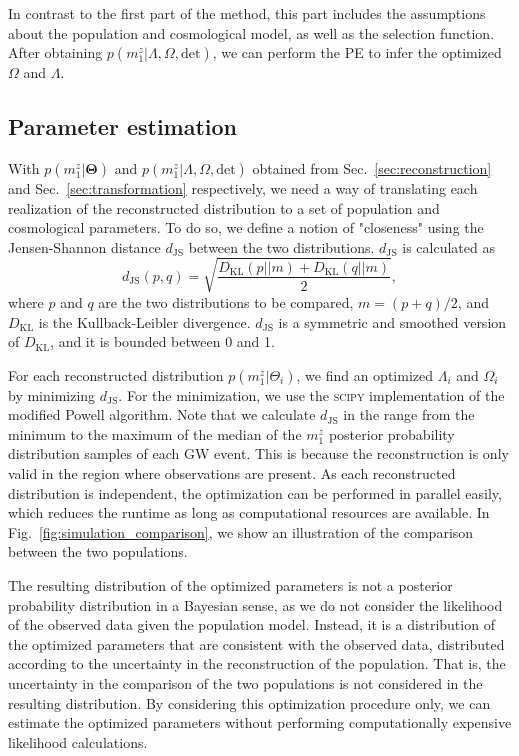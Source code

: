 \documentclass[sn-aps, pdflatex]{sn-jnl}
\begin{document}
In contrast to the first part of the method, this part includes the assumptions about the population and cosmological model, as well as the selection function.
After obtaining $p(m^z_1|\Lambda, \Omega, \mathrm{det})$, we can perform the \ac{PE} to infer the optimized $\Omega$ and $\Lambda$.

\subsection{Parameter estimation}
\label{sec:pe}

With $p(m^z_1|\mathbf{\Theta})$ and $p(m^z_1|\Lambda, \Omega, \mathrm{det})$ obtained from Sec.~\ref{sec:reconstruction} and Sec.~\ref{sec:transformation} respectively, we need a way of translating each realization of the reconstructed distribution to a set of population and cosmological parameters.
To do so, we define a notion of "closeness" using the Jensen-Shannon distance $d_\mathrm{JS}$ between the two distributions.
$d_\mathrm{JS}$ is calculated as
\begin{equation}
    d_\mathrm{JS}(p, q) = \sqrt{\frac{D_\mathrm{KL}(p||m) + D_\mathrm{KL}(q||m)}{2}},
\end{equation}
where $p$ and $q$ are the two distributions to be compared, $m = (p + q) / 2$, and $D_\mathrm{KL}$ is the Kullback-Leibler divergence.
$d_\mathrm{JS}$ is a symmetric and smoothed version of $D_\mathrm{KL}$, and it is bounded between 0 and 1.

For each reconstructed distribution $p(m^z_1|\Theta_i)$, we find an optimized $\Lambda_i$ and $\Omega_i$ by minimizing $d_\mathrm{JS}$.
For the minimization, we use the \textsc{scipy} \citep{2020SciPy-NMeth} implementation of the modified Powell algorithm.
Note that we calculate $d_\mathrm{JS}$ in the range from the minimum to the maximum of the median of the $m^z_1$ posterior probability distribution samples of each \ac{GW} event.
This is because the reconstruction is only valid in the region where observations are present.
As each reconstructed distribution is independent, the optimization can be performed in parallel easily, which reduces the runtime as long as computational resources are available.
In Fig.~\ref{fig:simulation_comparison}, we show an illustration of the comparison between the two populations.

The resulting distribution of the optimized parameters is not a posterior probability distribution in a Bayesian sense, as we do not consider the likelihood of the observed data given the population model.
Instead, it is a distribution of the optimized parameters that are consistent with the observed data, distributed according to the uncertainty in the reconstruction of the population.
That is, the uncertainty in the comparison of the two populations is not considered in the resulting distribution.
By considering this optimization procedure only, we can estimate the optimized parameters without performing computationally expensive likelihood calculations.
\end{document}
